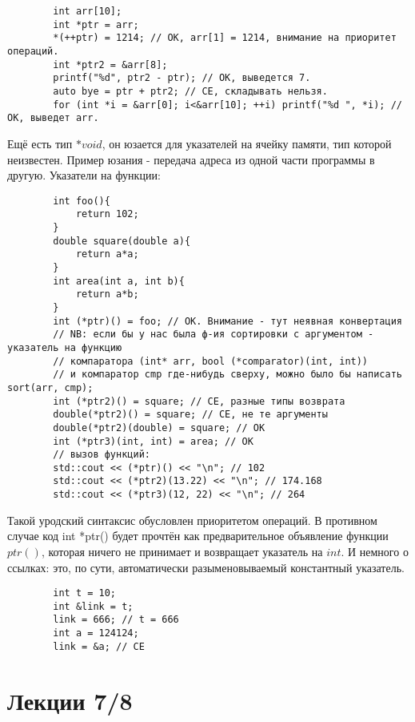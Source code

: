 \documentclass[15pt, a4paper]{article}
\newcommand{\nl}{\newline}
\begin{document}
    \begin{verbatim}
        int arr[10];
        int *ptr = arr;
        *(++ptr) = 1214; // OK, arr[1] = 1214, внимание на приоритет операций.
        int *ptr2 = &arr[8];
        printf("%d", ptr2 - ptr); // OK, выведется 7.
        auto bye = ptr + ptr2; // CE, складывать нельзя.
        for (int *i = &arr[0]; i<&arr[10]; ++i) printf("%d ", *i); // OK, выведет arr.
    \end{verbatim}
    Ещё есть тип $*void$, он юзается для указателей на ячейку памяти, тип которой неизвестен. Пример юзания - передача адреса из одной части программы в другую. \nl
    Указатели на функции:
    \begin{verbatim}
        int foo(){
            return 102;
        }
        double square(double a){
            return a*a;
        }    
        int area(int a, int b){
            return a*b;
        }
        int (*ptr)() = foo; // OK. Внимание - тут неявная конвертация
        // NB: если бы у нас была ф-ия сортировки с аргументом - указатель на функцию 
        // компаратора (int* arr, bool (*comparator)(int, int))
        // и компаратор cmp где-нибудь сверху, можно было бы написать sort(arr, cmp);
        int (*ptr2)() = square; // CE, разные типы возврата
        double(*ptr2)() = square; // CE, не те аргументы
        double(*ptr2)(double) = square; // OK
        int (*ptr3)(int, int) = area; // OK
        // вызов функций:
        std::cout << (*ptr)() << "\n"; // 102
        std::cout << (*ptr2)(13.22) << "\n"; // 174.168
        std::cout << (*ptr3)(12, 22) << "\n"; // 264
    \end{verbatim}
    Такой уродский синтаксис обусловлен приоритетом операций. В противном случае код int *ptr() будет прочтён как предварительное объявление
    функции $ptr()$, которая ничего не принимает и возвращает указатель на $int$. \nl
    И немного о ссылках: это, по сути, автоматически разыменовываемый константный указатель.
    \begin{verbatim}
        int t = 10;
        int &link = t;
        link = 666; // t = 666
        int a = 124124;
        link = &a; // CE
    \end{verbatim}
    \newpage

    \section{Лекции 7/8}
\end{document}
